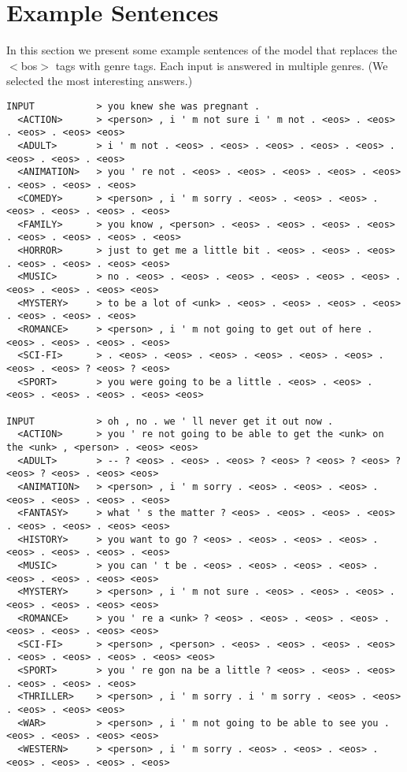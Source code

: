 \section{Example Sentences}
In this section we present some example sentences of the model that replaces the $<$bos$>$ tags with genre tags. Each input is answered in multiple genres. (We selected the most interesting answers.)

\begin{scriptsize}
\begin{verbatim}
INPUT           > you knew she was pregnant .
  <ACTION>      > <person> , i ' m not sure i ' m not . <eos> . <eos> . <eos> . <eos> <eos>
  <ADULT>       > i ' m not . <eos> . <eos> . <eos> . <eos> . <eos> . <eos> . <eos> . <eos>
  <ANIMATION>   > you ' re not . <eos> . <eos> . <eos> . <eos> . <eos> . <eos> . <eos> . <eos>
  <COMEDY>      > <person> , i ' m sorry . <eos> . <eos> . <eos> . <eos> . <eos> . <eos> . <eos>
  <FAMILY>      > you know , <person> . <eos> . <eos> . <eos> . <eos> . <eos> . <eos> . <eos> . <eos>
  <HORROR>      > just to get me a little bit . <eos> . <eos> . <eos> . <eos> . <eos> . <eos> <eos>
  <MUSIC>       > no . <eos> . <eos> . <eos> . <eos> . <eos> . <eos> . <eos> . <eos> . <eos> <eos>
  <MYSTERY>     > to be a lot of <unk> . <eos> . <eos> . <eos> . <eos> . <eos> . <eos> . <eos>
  <ROMANCE>     > <person> , i ' m not going to get out of here . <eos> . <eos> . <eos> . <eos>
  <SCI-FI>      > . <eos> . <eos> . <eos> . <eos> . <eos> . <eos> . <eos> . <eos> ? <eos> ? <eos>
  <SPORT>       > you were going to be a little . <eos> . <eos> . <eos> . <eos> . <eos> . <eos> <eos>

INPUT           > oh , no . we ' ll never get it out now .
  <ACTION>      > you ' re not going to be able to get the <unk> on the <unk> , <person> . <eos> <eos>
  <ADULT>       > -- ? <eos> . <eos> . <eos> ? <eos> ? <eos> ? <eos> ? <eos> ? <eos> . <eos> <eos>
  <ANIMATION>   > <person> , i ' m sorry . <eos> . <eos> . <eos> . <eos> . <eos> . <eos> . <eos>
  <FANTASY>     > what ' s the matter ? <eos> . <eos> . <eos> . <eos> . <eos> . <eos> . <eos> <eos>
  <HISTORY>     > you want to go ? <eos> . <eos> . <eos> . <eos> . <eos> . <eos> . <eos> . <eos>
  <MUSIC>       > you can ' t be . <eos> . <eos> . <eos> . <eos> . <eos> . <eos> . <eos> <eos>
  <MYSTERY>     > <person> , i ' m not sure . <eos> . <eos> . <eos> . <eos> . <eos> . <eos> <eos>
  <ROMANCE>     > you ' re a <unk> ? <eos> . <eos> . <eos> . <eos> . <eos> . <eos> . <eos> <eos>
  <SCI-FI>      > <person> , <person> . <eos> . <eos> . <eos> . <eos> . <eos> . <eos> . <eos> . <eos> <eos>
  <SPORT>       > you ' re gon na be a little ? <eos> . <eos> . <eos> . <eos> . <eos> . <eos>
  <THRILLER>    > <person> , i ' m sorry . i ' m sorry . <eos> . <eos> . <eos> . <eos> <eos>
  <WAR>         > <person> , i ' m not going to be able to see you . <eos> . <eos> . <eos> <eos>
  <WESTERN>     > <person> , i ' m sorry . <eos> . <eos> . <eos> . <eos> . <eos> . <eos> . <eos>



\end{verbatim}
\end{scriptsize}
